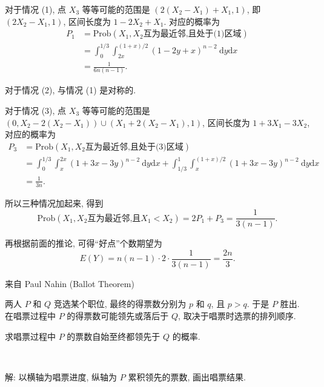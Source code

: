 对于情况 (1), 点 $X_3$ 等等可能的范围是 $(2(X_2-X_1)+X_1, 1)$, 即 $(2X_2-X_1, 1)$, 区间长度为 $1-2X_2+X_1$. 对应的概率为
\begin{align*}
P_1 &= \mathrm{Prob}(X_1,X_2\text{互为最近邻,且处于(1)区域}) \\
&= \int_0^{1/3}\int_{2x}^{(1+x)/2} (1 - 2y+x)^{n-2}\ \mathrm{d}y\mathrm{d}x\\
&= \frac{1}{6n(n-1)} .
\end{align*}

对于情况 (2), 与情况 (1) 是对称的. 

对于情况 (3), 点 $X_3$ 等等可能的范围是$(0, X_2-2(X_2-X_1))\cup (X_1+2(X_2-X_1), 1)$, 区间长度为 $1+3X_1 - 3X_2$, 对应的概率为
\begin{align*}
P_3 &= \mathrm{Prob}(X_1,X_2\text{互为最近邻,且处于(3)区域}) \\
&= \int_0^{1/3}\int_{x}^{2x}(1+3x-3y)^{n-2}\ \mathrm{d}y\mathrm{d}x + \int_{1/3}^1\int_{x}^{(1+x)/2}(1+3x-3y)^{n-2}\ \mathrm{d}y\mathrm{d}x\\
&= \frac{1}{3n} .
\end{align*}

所以三种情况加起来, 得到
\[\mathrm{Prob}(X_1,X_2\text{互为最近邻,且}X_1<X_2) = 2P_1 + P_3 = \frac{1}{3(n-1)} .\]

再根据前面的推论, 可得``好点''个数期望为 
\[E(Y) = n(n-1)\cdot 2\cdot\frac{1}{3(n-1)} = \frac{2n}{3} .\]

\newpage
\noindent 来自 Paul Nahin (Ballot Theorem)

两人 $P$ 和 $Q$ 竞选某个职位, 最终的得票数分别为 $p$ 和 $q$, 且 $p>q$. 于是 $P$ 胜出. 在唱票过程中 $P$ 的得票数可能领先或落后于 $Q$, 取决于唱票时选票的排列顺序. 

求唱票过程中 $P$ 的票数自始至终都领先于 $Q$ 的概率.

~

解: 以横轴为唱票进度, 纵轴为 $P$ 累积领先的票数, 画出唱票结果.
\begin{figure*}[htbp]
\centering
{}
\end{figure*}

